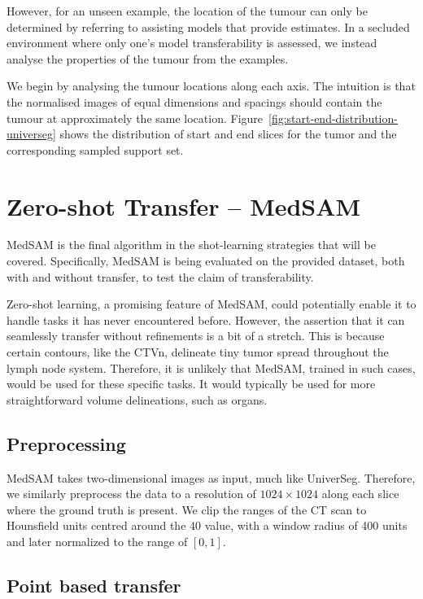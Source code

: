 \documentclass[12pt,twoside]{report}
\begin{document}
However, for an unseen example, the location of the tumour can only be determined by referring to assisting models that provide estimates. In a secluded environment where only one's model transferability is assessed, we instead analyse the properties of the tumour from the examples.

We begin by analysing the tumour locations along each axis. The intuition is that the normalised images of equal dimensions and spacings should contain the tumour at approximately the same location. Figure~\ref{fig:start-end-distribution-universeg} shows the distribution of start and end slices for the tumor and the corresponding sampled support set.

\section{Zero-shot Transfer -- MedSAM}

MedSAM is the final algorithm in the shot-learning strategies that will be covered. Specifically, MedSAM is being evaluated on the provided dataset, both with and without transfer, to test the claim of transferability.

Zero-shot learning, a promising feature of MedSAM, could potentially enable it to handle tasks it has never encountered before. However, the assertion that it can seamlessly transfer without refinements is a bit of a stretch. This is because certain contours, like the CTVn, delineate tiny tumor spread throughout the lymph node system. Therefore, it is unlikely that MedSAM, trained in such cases, would be used for these specific tasks. It would typically be used for more straightforward volume delineations, such as organs.

\subsection{Preprocessing}

MedSAM takes two-dimensional images as input, much like UniverSeg. Therefore, we similarly preprocess the data to a resolution of $1024 \times 1024$ along each slice where the ground truth is present. We clip the ranges of the CT scan to Hounsfield units centred around the 40 value, with a window radius of 400 units and later normalized to the range of $[0,1]$. 

\subsection{Point based transfer}
\end{document}
